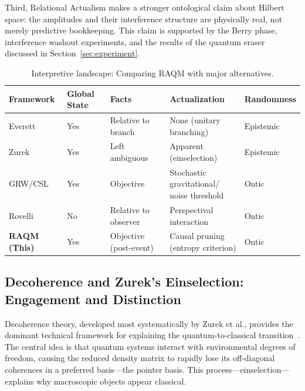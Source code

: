 \documentclass[11pt,a4paper]{article}
\theoremstyle{plain}
\theoremstyle{definition}
\theoremstyle{remark}
\begin{document}
Third, Relational Actualism makes a stronger ontological claim about Hilbert
space: the amplitudes and their interference structure are physically real, not
merely predictive bookkeeping. This claim is supported by the Berry phase,
interference washout experiments, and the results of the quantum eraser discussed
in Section~\ref{sec:experiment}.

\begin{table}[ht]
\centering
\caption{Interpretive landscape: Comparing RAQM with major alternatives.}
\label{tab:landscape}
\small
\begin{tabular}{lllll}
\toprule
\textbf{Framework} & \textbf{Global State} & \textbf{Facts} &
\textbf{Actualization} & \textbf{Randomness}\\
\midrule
Everett \citep{Everett1957}
  & Yes & Relative to branch & None (unitary branching) & Epistemic\\[2pt]
Zurek \citep{Zurek2003}
  & Yes & Left ambiguous & Apparent (einselection) & Epistemic\\[2pt]
GRW/CSL \citep{Bassi2013}
  & Yes & Objective
  & \parbox[t]{3cm}{Stochastic gravitational/\\noise threshold} & Ontic\\[6pt]
Rovelli \citep{Rovelli1996}
  & No & Relative to observer & Perspectival interaction & Ontic\\[2pt]
\textbf{RAQM (This)}
  & Yes & Objective (post-event)
  & \parbox[t]{3cm}{Causal pruning\\(entropy criterion)} & Ontic\\
\bottomrule
\end{tabular}
\end{table}

\subsection{Decoherence and Zurek's Einselection: Engagement and Distinction}

Decoherence theory, developed most systematically by Zurek et al., provides the
dominant technical framework for explaining the quantum-to-classical
transition~\citep{Zurek1981,Zurek2003,JoosZeh1985}. The central idea is that
quantum systems interact with environmental degrees of freedom, causing the reduced
density matrix to rapidly lose its off-diagonal coherences in a preferred
basis---the pointer basis. This process---einselection---explains why macroscopic
objects appear classical.
\end{document}
